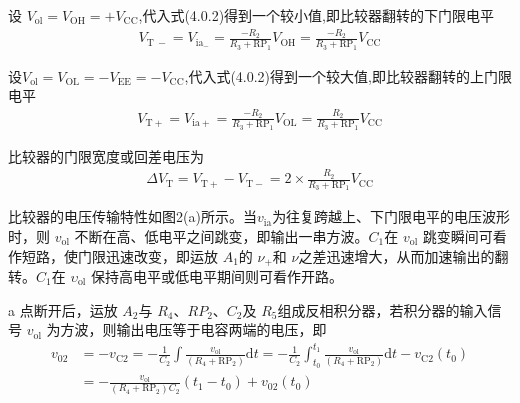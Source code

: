\documentclass[a4paper,11pt,UTF8]{article}
\numberwithin{equation}{subsection}
\begin{document}
设 $V_{\mathrm{ol}}=V_{\mathrm{OH}}=+V_{\mathrm{CC}}$,代入式(4.0.2)得到一个较小值,即比较器翻转的下门限电平
\begin{align}
	V_{\mathrm{T~-}}=V_{\mathrm{ia}_{-}}=\frac{-R_{2}}{R_{3}+\mathrm{RP}_{1}}V_{\mathrm{OH}}=\frac{-R_{2}}{R_{3}+\mathrm{RP}_{1}}V_{\mathrm{CC}}
\end{align}

设$V_{\mathrm{ol}}=V_{\mathrm{OL}}=-V_{\mathrm{EE}}=-V_{\mathrm{CC}}$,代入式(4.0.2)得到一个较大值,即比较器翻转的上门限电平
\begin{align}
	V_{\mathrm{T}+}=V_{\mathrm{ia}+}=\frac{-R_{2}}{R_{3}+\mathrm{RP}_{1}}V_{\mathrm{OL}}=\frac{R_{2}}{R_{3}+\mathrm{RP}_{1}}V_{\mathrm{CC}}
\end{align}

比较器的门限宽度或回差电压为
\begin{align}
	\Delta V_{\mathrm{T}}=V_{\mathrm{T+}}-V_{\mathrm{T-}}=2\times\frac{R_{2}}{R_{3}+\mathrm{RP}_{1}}V_{\mathrm{CC}}
\end{align}

比较器的电压传输特性如图2(a)所示。当$v_\mathrm{ia}$为往复跨越上、下门限电平的电压波形时，则 $v_\mathrm{ol}$ 不断在高、低电平之间跳变，即输出一串方波。$C_1$在 $v_\mathrm{ol}$ 跳变瞬间可看作短路，使门限迅速改变，即运放 $A_1$的 $\nu_+$和 $\nu$之差迅速增大，从而加速输出的翻转。$C_1$在 $\upsilon_\mathrm{ol}$ 保持高电平或低电平期间则可看作开路。
\begin{figure}[H]
	\centering
	\caption{}
\end{figure}
a 点断开后，运放 $A_2$与 $R_4$、$RP_2$、$C_2$及 $R_5$组成反相积分器，若积分器的输入信号 $v_\mathrm{ol}$ 为方波，则输出电压等于电容两端的电压，即
\begin{align}
	v_{02}& =-v_{\mathrm{C2}}=-\frac{1}{C_{2}}\int\frac{v_{\mathrm{ol}}}{(R_{4}+\mathrm{RP}_{2})}\mathrm{d}t=-\frac{1}{C_{2}}\int_{t_{0}}^{t_{1}}\frac{v_{\mathrm{ol}}}{(R_{4}+\mathrm{RP}_{2})}\mathrm{d}t-v_{\mathrm{C2}}(t_{0})\nonumber\\ &=-\frac{v_{\mathrm{ol}}}{(R_{4}+\mathrm{RP}_{2})C_{2}}(t_{1}-t_{0})+v_{02}(t_{0})
\end{align}
\end{document}
